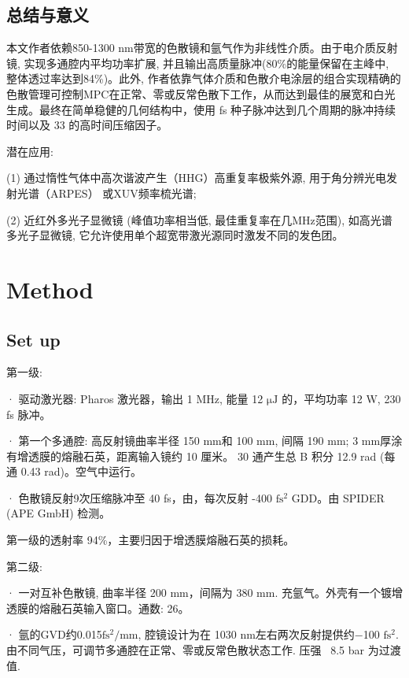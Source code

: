 \documentclass[14pt,a4paper,oneside]{article}
\numberwithin{equation}{subsection}             %
\numberwithin{figure}{subsection}               %
\begin{document}
\subsection{总结与意义}

本文作者依赖850-1300 nm带宽的色散镜和氩气作为非线性介质。由于电介质反射镜, 实现多通腔内平均功率扩展, 并且输出高质量脉冲(80\%的能量保留在主峰中, 整体透过率达到84\%)。此外, 作者依靠气体介质和色散介电涂层的组合实现精确的色散管理可控制MPC在正常、零或反常色散下工作，从而达到最佳的展宽和白光生成。最终在简单稳健的几何结构中，使用 fs 种子脉冲达到几个周期的脉冲持续时间以及 33 的高时间压缩因子。

潜在应用:

(1) 通过惰性气体中高次谐波产生（HHG）高重复率极紫外源\cite{klasUltrashortpulseHighaveragepowerMegahertzrepetitionrate2021}, 用于角分辨光电发射光谱（ARPES）\cite{puppinTimeandAngleresolvedPhotoemission2019} 或XUV频率梳光谱;

(2) 近红外多光子显微镜\cite{mojzisovaWhenMultiphotonMicroscopy2011} (峰值功率相当低, 最佳重复率在几MHz范围), 如高光谱多光子显微镜\cite{baresHyperspectralMultiphotonMicroscopy2020}, 它允许使用单个超宽带激光源同时激发不同的发色团。



\section{Method}

\subsection{Set up}

第一级: 

· 驱动激光器: Pharos 激光器，输出 1 MHz, 能量 12 $\mathrm{\mu J}$ 的，平均功率 12 W, 230 fs 脉冲。

· 第一个多通腔: 高反射镜曲率半径 150 mm和 100 mm, 间隔 190 mm;  3 mm厚涂有增透膜的熔融石英，距离输入镜约 10 厘米。 30 通产生总 B 积分 12.9 rad (每通 0.43 rad)。空气中运行。

· 色散镜反射9次压缩脉冲至 40 fs，由，每次反射 -400 $\mathrm{fs^2}$  GDD。由 SPIDER (APE GmbH) 检测。

第一级的透射率 94\%，主要归因于增透膜熔融石英的损耗。

第二级: 

· 一对互补色散镜, 曲率半径 200 mm，间隔为 380 mm. 充氩气。外壳有一个镀增透膜的熔融石英输入窗口。通数: 26。

· 氩的GVD约0.015$\mathrm{fs^2/mm}$, 腔镜设计为在 1030 nm左右两次反射提供约−100 $\mathrm{fs^2}$. 由不同气压，可调节多通腔在正常、零或反常色散状态工作. 压强 ~8.5 bar 为过渡值.
\end{document}
